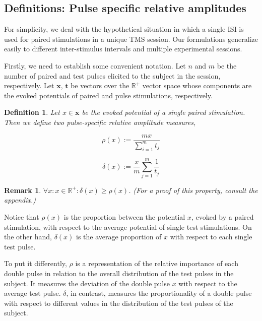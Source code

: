 \documentclass{article}
\newtheorem{definition}{Definition}
\newtheorem{remark}{Remark}
\begin{document}
\begin{multicols}{2}
\subsection{Definitions: Pulse specific relative amplitudes}

For simplicity, we deal with the hypothetical situation in which a single ISI is
used for paired stimulations in a unique TMS session. Our formulations
generalize easily to different inter-stimulus intervals and multiple
experimental sessions.

Firstly, we need to establish some convenient notation. Let $n$ and $m$ be the
number of paired and test pulses elicited to the subject in the session,
respectively. Let $\textbf{x}$, $\textbf{t}$ be vectors over the $\mathbb{R}^+$
vector space whose components are the evoked potentials of paired and pulse
stimulations, respectively.


\begin{definition} 


    Let $x \in \textbf{x}$ be the evoked potential of a single paired
    stimulation. Then we define two pulse-specific relative amplitude measures,

    \begin{equation} 
        \rho(x) := \frac{mx}{\sum_{i=1}^mt_j}
    \end{equation}

    \begin{equation} 
        \delta(x) := \frac{x}{m}\sum_{j=1}^m\frac{1}{t_j} 
    \end{equation}
\end{definition}

\begin{remark} 
    $\forall x: x \in \mathbb{R}^+:\delta(x) \geq \rho(x)$. (For a proof of this
    property, consult the appendix.) 
\end{remark}

Notice that $\rho(x)$ is the proportion between the potential $x$, evoked by a
paired stimulation, with respect to the average potential of single test
stimulations. On the other hand, $\delta(x)$ is the average proportion of $x$
with respect to each single test pulse. 

To put it differently, $\rho$ is a representation of the relative importance of
each double pulse in relation to the overall distribution of the test pulses in
the subject. It measures the deviation of the double pulse $x$ with respect to
the average test pulse. $\delta$, in contrast, measures the proportionality of a
double pulse with respect to different values in the distribution of the test
pulses of the subject.


\end{multicols}
\end{document}
